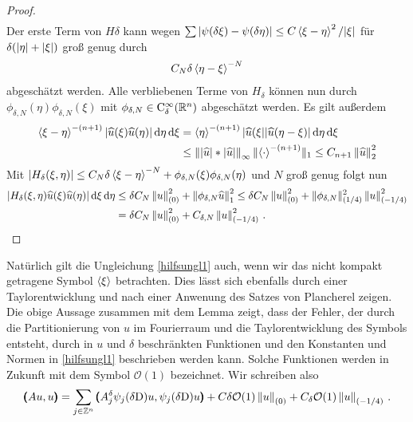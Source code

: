 \begin{proof}
\begin{align}
\end{align}
Der erste Term von $H\delta$ kann wegen $\sum|\psi(\delta\xi)-\psi(\delta\eta)|\le C \braket{\xi-\eta}^2/\lvert\xi\rvert$ für  $\delta(\lvert\eta\rvert + \lvert\xi\rvert)$ groß genug durch
\begin{align}
C_N\delta\braket{\eta-\xi}^{-N}
\end{align}
abgeschätzt werden. Alle verbliebenen Terme von $H_\delta$ können nun durch $\phi_{\delta,N}(\eta)\phi_{\delta,N}(\xi)$ mit $\phi_{\delta,N}\in\mathrm C^\infty_\delta(\mathbb R^n)$ abgeschätzt werden. Es gilt außerdem
\begin{align}
\relax\braket{\xi-\eta}^{-(n+1)}|\widehat u(\xi)\widehat u(\eta)|\,\mathrm d\eta\,\mathrm d\xi &= \relax \braket{\eta}^{-(n+1)}|\widehat{u}(\xi||\widehat u(\eta-\xi)|\,\mathrm d\eta\,\mathrm d\xi\\
&\le \left\lVert\lvert\widehat u\rvert * \lvert\widehat u\rvert\right\rVert_\infty \lVert\braket{\cdot}^{-(n+1)}\rVert_1\le C_{n+1} \left\lVert\widehat u\right\rVert_2^2
\end{align}
Mit $|H_\delta(\xi,\eta)|\le C_N\delta\braket{\xi-\eta}^{-N} +\phi_{\delta,N}(\xi)\phi_{\delta,N}(\eta)$ und $N$ groß genug folgt nun
\begin{align}
\relax|H_\delta(\xi,\eta)\widehat u(\xi)\widehat u(\eta)|\,\mathrm d\xi\,\mathrm d\eta &\le \delta C_N \left\lVert u\right\rVert^2_{(0)} + \left\lVert\phi_{\delta,N} \widehat u\right\rVert_1^2 \le \delta C_N \left\lVert u\right\rVert^2_{(0)} + \|\phi_{\delta,N}\|_{(1/4)}^2 \left\lVert u\right\rVert_{(-1/4)}^2 \\
&= \delta C_N \left\lVert u\right\rVert^2_{(0)} +  C_{\delta,N} \left\lVert u\right\rVert_{(-1/4)}^2\,.
\end{align}

\end{proof}

Natürlich gilt die Ungleichung \eqref{hilfsungl1} auch, wenn wir das nicht kompakt getragene Symbol $\braket{\xi}$ betrachten. Dies lässt sich ebenfalls durch einer Taylorentwicklung und nach einer Anwenung des Satzes von Plancherel zeigen.
Die obige Aussage zusammen mit dem Lemma zeigt, dass der Fehler, der durch die Partitionierung von $u$ im Fourierraum und die Taylorentwicklung des Symbols entsteht, durch in $u$ und $\delta$ beschränkten Funktionen und den Konstanten und Normen in \eqref{hilfsungl1} beschrieben werden kann. Solche Funktionen werden in Zukunft mit dem Symbol $\mathcal O(1)$ bezeichnet. Wir schreiben also
\begin{align}
\pmb(Au,u\pmb) = \sum_{j\in\mathbb Z^n} \pmb(A_j^\delta \psi_j(\delta\mathrm D)u,\psi_j(\delta\mathrm D)u\pmb) + C\delta \mathcal{O}(1) \left\lVert u\right\rVert_{(0)} + C_\delta \mathcal O(1)\left\lVert u\right\rVert_{(-1/4)}\,.
\end{align}

